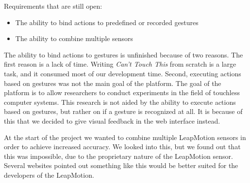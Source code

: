 \documentclass[a4paper]{article}
\providecommand{\tightlist}{%
\setlength{\itemsep}{0pt}\setlength{\parskip}{0pt}}
\begin{document}
  Requirements that are still open:
  \begin{itemize}
    \tightlist
    \item The ability to bind actions to predefined or recorded gestures
    \item The ability to combine multiple sensors
  \end{itemize}
  The ability to bind actions to gestures is unfinished because of two reasons.
  The first reason is a lack of time. Writing \textit{Can't Touch This} from
  scratch is a large task, and it consumed most of our development time. Second,
  executing actions based on gestures was not the main goal of the platform. The
  goal of the platform is to allow researchers to conduct experiments in the
  field of touchless computer systems. This research is not aided by the ability
  to execute actions based on gestures, but rather on if a gesture is
  recognized at all. It is because of this that we decided to give visual
  feedback in the web interface instead.

  At the start of the project we wanted to combine multiple LeapMotion sensors
  in order to achieve increased accuracy. We looked into this, but we found out
  that this was impossible, due to the proprietary nature of the LeapMotion
  sensor. Several websites pointed out something like this would be better
  suited for the developers of the LeapMotion.
  \clearpage



\end{document}

